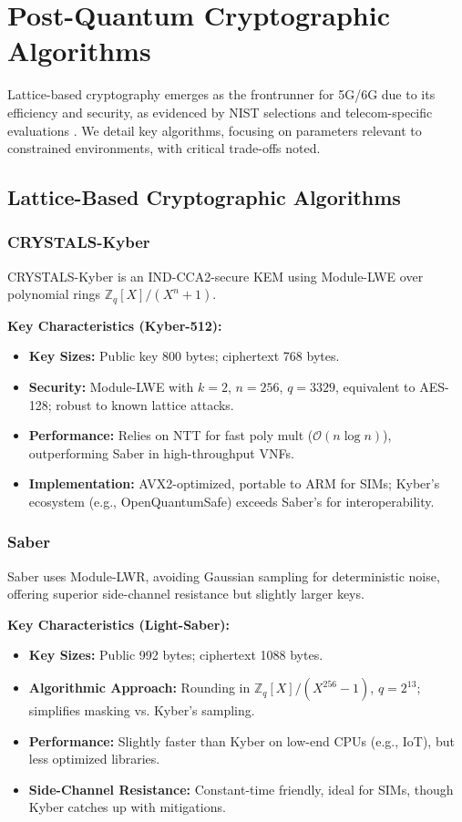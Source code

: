 \documentclass[11pt,a4paper]{article}
\begin{document}
\section{Post-Quantum Cryptographic Algorithms}

Lattice-based cryptography emerges as the frontrunner for 5G/6G due to its efficiency and security, as evidenced by NIST selections and telecom-specific evaluations \cite{zhou2023}. We detail key algorithms, focusing on parameters relevant to constrained environments, with critical trade-offs noted.

\subsection{Lattice-Based Cryptographic Algorithms}

\subsubsection{CRYSTALS-Kyber}

CRYSTALS-Kyber is an IND-CCA2-secure KEM using Module-LWE over polynomial rings $\mathbb{Z}_q[X]/(X^n+1)$.

\textbf{Key Characteristics (Kyber-512):}
\begin{itemize}
    \item \textbf{Key Sizes:} Public key 800 bytes; ciphertext 768 bytes.
    \item \textbf{Security:} Module-LWE with $k=2$, $n=256$, $q=3329$, equivalent to AES-128; robust to known lattice attacks.
    \item \textbf{Performance:} Relies on NTT for fast poly mult ($\mathcal{O}(n \log n)$), outperforming Saber in high-throughput VNFs.
    \item \textbf{Implementation:} AVX2-optimized, portable to ARM for SIMs; Kyber's ecosystem (e.g., OpenQuantumSafe) exceeds Saber's for interoperability.
\end{itemize}

\subsubsection{Saber}

Saber uses Module-LWR, avoiding Gaussian sampling for deterministic noise, offering superior side-channel resistance but slightly larger keys.

\textbf{Key Characteristics (Light-Saber):}
\begin{itemize}
    \item \textbf{Key Sizes:} Public 992 bytes; ciphertext 1088 bytes.
    \item \textbf{Algorithmic Approach:} Rounding in $\mathbb{Z}_q[X]/(X^{256}-1)$, $q=2^{13}$; simplifies masking vs. Kyber's sampling.
    \item \textbf{Performance:} Slightly faster than Kyber on low-end CPUs (e.g., IoT), but less optimized libraries.
    \item \textbf{Side-Channel Resistance:} Constant-time friendly, ideal for SIMs, though Kyber catches up with mitigations.
\end{itemize}
\end{document}
